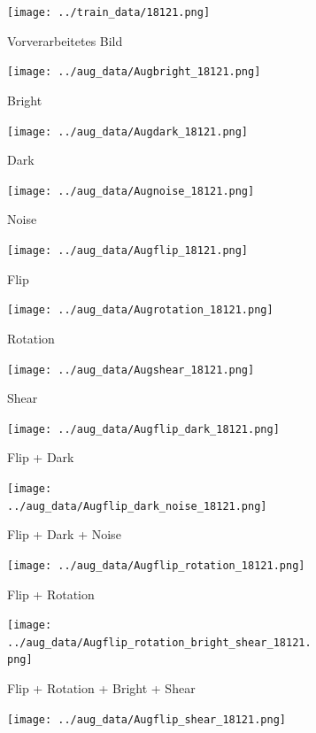\begin{figure}[H]
	\centering
	\begin{subfigure}[b]{0.2\textwidth}
		\texttt{[image: ../train\_data/18121.png]}
		\caption{Vorverarbeitetes Bild}
	\end{subfigure} \hfill
	\begin{subfigure}[b]{0.2\textwidth}
		\texttt{[image: ../aug\_data/Augbright\_18121.png]}
		\caption{Bright}
	\end{subfigure} \hfill
	\begin{subfigure}[b]{0.2\textwidth}
		\texttt{[image: ../aug\_data/Augdark\_18121.png]}
		\caption{Dark}
	\end{subfigure} \hfill
	\begin{subfigure}[b]{0.2\textwidth}
		\texttt{[image: ../aug\_data/Augnoise\_18121.png]}
		\caption{Noise}
	\end{subfigure} \hfill
	\begin{subfigure}[b]{0.2\textwidth}
		\texttt{[image: ../aug\_data/Augflip\_18121.png]}
		\caption{Flip}
	\end{subfigure} \hfill
	\begin{subfigure}[b]{0.2\textwidth}
		\texttt{[image: ../aug\_data/Augrotation\_18121.png]}
		\caption{Rotation}
	\end{subfigure} \hfill
	\begin{subfigure}[b]{0.2\textwidth}
		\texttt{[image: ../aug\_data/Augshear\_18121.png]}
		\caption{Shear}
	\end{subfigure} \hfill
	\begin{subfigure}[b]{0.2\textwidth}
		\texttt{[image: ../aug\_data/Augflip\_dark\_18121.png]}
		\caption{Flip + Dark}
	\end{subfigure} \hfill
	\begin{subfigure}[b]{0.2\textwidth}
		\texttt{[image: ../aug\_data/Augflip\_dark\_noise\_18121.png]}
		\caption{Flip + Dark + Noise}
	\end{subfigure} \hfill
	\begin{subfigure}[b]{0.2\textwidth}
		\texttt{[image: ../aug\_data/Augflip\_rotation\_18121.png]}
		\caption{Flip + Rotation}
	\end{subfigure} \hfill
	\begin{subfigure}[b]{0.2\textwidth}
		\texttt{[image: ../aug\_data/Augflip\_rotation\_bright\_shear\_18121.png]}
		\caption{Flip + Rotation + Bright + Shear}
	\end{subfigure} \hfill
	\begin{subfigure}[b]{0.2\textwidth}
		\texttt{[image: ../aug\_data/Augflip\_shear\_18121.png]}

\end{subfigure}
\end{figure}
